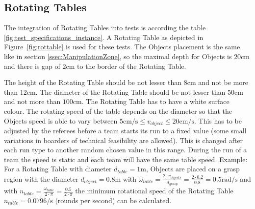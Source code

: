 \subsection{Rotating Tables}\label{sec:Rotating Table}
The integration of Rotating Tables into tests is according the table \ref{fig:test_specifications_instance}.  A Rotating Table as depicted in Figure~\ref{fig:rottable} is used for these tests. The Objects placement is the same like in section \ref{ssec:ManipulationZone}, so the maximal depth for Objects is $20 \si{\centi\meter}$ and there is gap of $2\si{\centi\meter}$ to the border of the Rotating Table.


The height of the Rotating Table should be not lesser than $8\si{\centi\meter}$ and not be more than $12\si{\centi\meter}$. The diameter of the Rotating Table should be not lesser than $50\si{\centi\meter}$ and not more than $100\si{\centi\meter}$. The Rotating Table has to have a white surface colour. The rotating speed of the table depends on the diameter so that the Objects speed is able to vary between $5 \si{\centi\meter\per\second} \le v_{object} \le 20 \si{\centi\meter\per\second}$. This has to be adjusted by the referees before a team starts its run to a fixed value (some small variations in boarders of  technical feasibility are allowed). This is changed after each run type to another random chosen value in this range. During the run of a team the speed is static and each team will have the same table speed. Example: For a Rotating Table with diameter $d_{table}=1\si{\meter}$, Objects are placed on a grasp region with the diameter $d_{object}=0.8\si{\meter}$ with $\omega_{table} = \frac{2 \cdot v_{objects} }{d_{grasp}}=\frac{2 \cdot 0.2}{0.8}=0.5\si{\radian\per\second}$ and with $n_{table}=\frac{\omega_{table}}{2 \cdot \pi}=\frac{0.5}{2 \cdot \pi}$ the minimum rotational speed of the Rotating Table $n_{table}= 0.0796 \si{\per\second}$ (rounds per second) can be calculated.  


